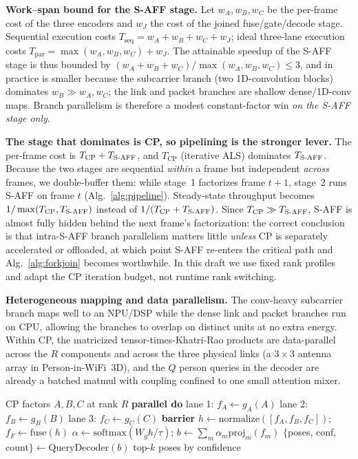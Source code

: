 \documentclass[10pt,conference]{IEEEtran}
\begin{document}
\textbf{Work--span bound for the S-AFF stage.}
Let $w_A,w_B,w_C$ be the per-frame cost of the three encoders and $w_J$ the cost of the joined fuse/gate/decode stage. Sequential execution costs $T_\text{seq}=w_A+w_B+w_C+w_J$; ideal three-lane execution costs $T_\text{par}=\max(w_A,w_B,w_C)+w_J$. The attainable speedup of the S-AFF stage is thus bounded by $(w_A+w_B+w_C)/\max(w_A,w_B,w_C)\le 3$, and in practice is smaller because the subcarrier branch (two 1D-convolution blocks) dominates $w_B\gg w_A,w_C$; the link and packet branches are shallow dense/1D-conv maps. Branch parallelism is therefore a modest constant-factor win \emph{on the S-AFF stage only}.

\textbf{The stage that dominates is CP, so pipelining is the stronger lever.}
The per-frame cost is $T_\text{CP}+T_\text{S\text{-}AFF}$, and $T_\text{CP}$ (iterative ALS) dominates $T_\text{S\text{-}AFF}$. Because the two stages are sequential \emph{within} a frame but independent \emph{across} frames, we double-buffer them: while stage~1 factorizes frame $t{+}1$, stage~2 runs S-AFF on frame $t$ (Alg.~\ref{alg:pipeline}). Steady-state throughput becomes $1/\max(T_\text{CP},T_\text{S\text{-}AFF})$ instead of $1/(T_\text{CP}+T_\text{S\text{-}AFF})$. Since $T_\text{CP}\gg T_\text{S\text{-}AFF}$, S-AFF is almost fully hidden behind the next frame's factorization: the correct conclusion is that intra-S-AFF branch parallelism matters little \emph{unless} CP is separately accelerated or offloaded, at which point S-AFF re-enters the critical path and Alg.~\ref{alg:forkjoin} becomes worthwhile. In this draft we use fixed rank profiles and adapt the CP iteration budget, not runtime rank switching.

\textbf{Heterogeneous mapping and data parallelism.}
The conv-heavy subcarrier branch maps well to an NPU/DSP while the dense link and packet branches run on CPU, allowing the branches to overlap on distinct units at no extra energy. Within CP, the matricized tensor-times-Khatri-Rao products are data-parallel across the $R$ components and across the three physical links (a $3\times3$ antenna array in Person-in-WiFi~3D), and the $Q$ person queries in the decoder are already a batched matmul with coupling confined to one small attention mixer.

\begin{algorithm}[t]
\caption{Fork--join S-AFF inference (per frame)}
\label{alg:forkjoin}
\begin{algorithmic}[1]
\Require CP factors $A,B,C$ at rank $R$
\State \textbf{parallel do} 
\State \quad lane 1: $f_A \gets g_A(A)$
\State \quad lane 2: $f_B \gets g_B(B)$ 
\State \quad lane 3: $f_C \gets g_C(C)$
\State \textbf{barrier}
\State $h \gets \mathrm{normalize}([f_A,f_B,f_C])$; \quad $f_F \gets \mathrm{fuse}(h)$
\State $\alpha \gets \mathrm{softmax}(W_g h/\tau)$; \quad $b \gets \sum_m \alpha_m \mathrm{proj}_m(f_m)$
\State $\{$poses, conf, count$\} \gets \mathrm{QueryDecoder}(b)$
\State \Return top-$k$ poses by confidence
\end{algorithmic}
\end{algorithm}
\end{document}
